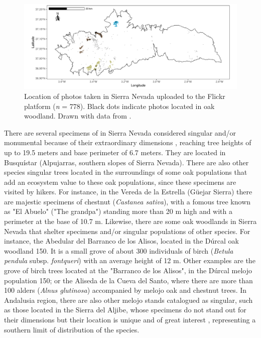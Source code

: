 \begin{figure}
    \centering
    \includegraphics[width=\textwidth]{img/es/es-flicker.pdf}\caption{Location of photos taken in Sierra Nevada uploaded to the Flickr platform (\emph{n} = 778). Black dots indicate photos located in oak woodland. Drawn with data from \citet{RosCandeiraetal2020SocialMedia}. 
}\label{fig:es:flicker}
\end{figure}
 
There are several specimens of \Qp in Sierra Nevada considered singular and/or monumental because of their extraordinary dimensions \autocite{IruritaFernandezetal2003ArbolesArboledas}, reaching tree heights of up to 19.5 meters and base perimeter of 6.7 meters. They are located in Busquístar (Alpujarras, southern slopes of Sierra Nevada). There are also other species singular trees located in the surroundings of some oak populations that add an ecosystem value to these oak populations, since these specimens are visited by hikers. For instance, in the Vereda de la Estrella (Güejar Sierra) there are majestic specimens of chestnut (\emph{Castanea sativa}), with a fomous tree known as "El Abuelo" ("The grandpa") standing more than 20 m high and with a perimeter at the base of 10.7 m. Likewise, there are some oak woodlands in Sierra Nevada that shelter specimens and/or singular populations of other species. For instance, the Abedular del Barranco de los Alisos, located in the Dúrcal oak woodland 150. It is a small grove of about 300 individuals of birch (\emph{Betula pendula} subsp. \emph{fontqueri}) with an average height of 12 m. Other examples are the grove of birch trees located at the "Barranco de los Alisos", in the Dúrcal melojo population 150; or the Aliseda de la Cueva del Santo, where there are more than 100 alders (\emph{Alnus glutinosa}) accompanied by melojo oak and chestnut trees. In Andalusia region, there are also other melojo stands catalogued as singular, such as those located in the Sierra del Aljibe, whose specimens do not stand out for their dimensions but their location is unique and of great interest \autocite{SanchezGarciaetal2003ArbolesArboledas}, representing a southern limit of distribution of the species.

